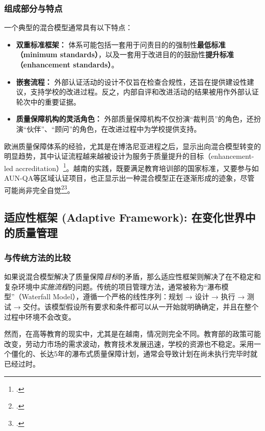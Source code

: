 \subsubsection{组成部分与特点}
一个典型的混合模型通常具有以下特点：
\begin{itemize}
    \item \textbf{双重标准框架：} 体系可能包括一套用于问责目的的强制性\textbf{最低标准（minimum standards）}，以及一套用于改进目的的鼓励性\textbf{提升标准（enhancement standards）}。
    \item \textbf{嵌套流程：} 外部认证活动的设计不仅旨在检查合规性，还旨在提供建设性建议，支持学校的改进过程。反之，内部自评和改进活动的结果被用作外部认证轮次中的重要证据。
    \item \textbf{质量保障机构的灵活角色：} 外部质量保障机构不仅扮演“裁判员”的角色，还扮演“伙伴”、“顾问”的角色，在改进过程中为学校提供支持。
\end{itemize}
欧洲质量保障体系的经验，尤其是在博洛尼亚进程之后，显示出向混合模型转变的明显趋势，其中认证流程越来越被设计为服务于质量提升的目标（enhancement-led accreditation）\footcite{EUA_Integration}。越南的实践，既要满足教育培训部的国家标准，又要参与如AUN-QA等区域认证项目，也正显示出一种混合模型正在逐渐形成的迹象，尽管可能尚非完全自觉\footcite{VNU-CEA2023}\footcite{HangNguyen2017}。





\subsection{适应性框架 (Adaptive Framework): 在变化世界中的质量管理}
\label{subsec:khung_thich_ung}

\subsubsection{与传统方法的比较}
如果说混合模型解决了质量保障\textit{目标}的矛盾，那么适应性框架则解决了在不稳定和复杂环境中\textit{实施流程}的问题。传统的项目管理方法，通常被称为“瀑布模型”（Waterfall Model），遵循一个严格的线性序列：规划 → 设计 → 执行 → 测试 → 交付。该模型假设所有要求和条件都可以从一开始就明确确定，并且在整个过程中环境不会改变。

然而，在高等教育的现实中，尤其是在越南，情况则完全不同。教育部的政策可能改变，劳动力市场的需求波动，教育技术发展迅速，学校的资源也不稳定。采用一个僵化的、长达5年的瀑布式质量保障计划，通常会导致计划在尚未执行完毕时就已经过时。

